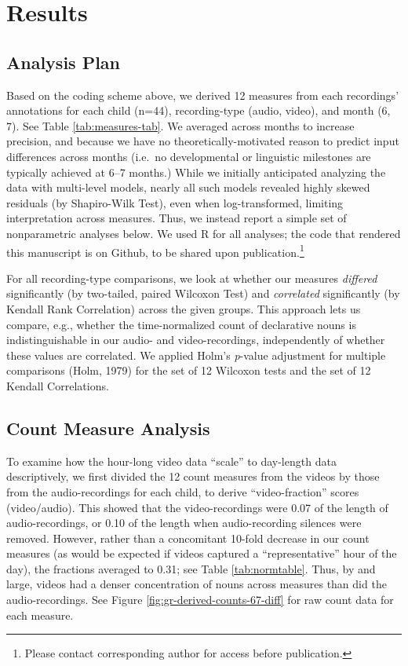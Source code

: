 \documentclass[man]{apa6}
\theoremstyle{definition}
\theoremstyle{definition}
\theoremstyle{definition}
\theoremstyle{remark}
\begin{document}
\section{Results}\label{results}

\subsection{Analysis Plan}\label{analysis-plan}

Based on the coding scheme above, we derived 12 measures from each
recordings' annotations for each child (n=44), recording-type (audio,
video), and month (6, 7). See Table \ref{tab:measures-tab}. We averaged
across months to increase precision, and because we have no
theoretically-motivated reason to predict input differences across
months (i.e.~no developmental or linguistic milestones are typically
achieved at 6--7 months.) While we initially anticipated analyzing the
data with multi-level models, nearly all such models revealed highly
skewed residuals (by Shapiro-Wilk Test), even when log-transformed,
limiting interpretation across measures. Thus, we instead report a
simple set of nonparametric analyses below. We used R for all analyses;
the code that rendered this manuscript is on Github, to be shared upon
publication.\footnote{Please contact corresponding author for access before publication.}

For all recording-type comparisons, we look at whether our measures
\emph{differed} significantly (by two-tailed, paired Wilcoxon Test) and
\emph{correlated} significantly (by Kendall Rank Correlation) across the
given groups. This approach lets us compare, e.g., whether the
time-normalized count of declarative nouns is indistinguishable in our
audio- and video-recordings, independently of whether these values are
correlated. We applied Holm's \emph{p}-value adjustment for multiple
comparisons (Holm, 1979) for the set of 12 Wilcoxon tests and the set of
12 Kendall Correlations.

\subsection{Count Measure Analysis}\label{count-measure-analysis}

To examine how the hour-long video data \enquote{scale} to day-length
data descriptively, we first divided the 12 count measures from the
videos by those from the audio-recordings for each child, to derive
\enquote{video-fraction} scores (video/audio). This showed that the
video-recordings were 0.07 of the length of audio-recordings, or 0.10 of
the length when audio-recording silences were removed. However, rather
than a concomitant 10-fold decrease in our count measures (as would be
expected if videos captured a \enquote{representative} hour of the day),
the fractions averaged to 0.31; see Table \ref{tab:normtable}. Thus, by
and large, videos had a denser concentration of nouns across measures
than did the audio-recordings. See Figure
\ref{fig:gr-derived-counts-67-diff} for raw count data for each measure.
\end{document}
